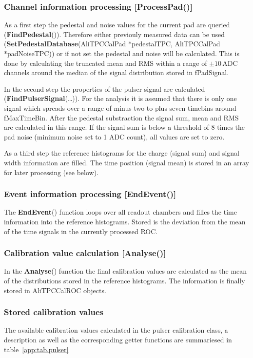 \subsubsection{Channel information processing {\small [ProcessPad()]}}
As a first step the pedestal and noise values for the current pad are queried ({\bf FindPedestal}()). Therefore either previouly measured data can be used ({\bf SetPedestalDatabase}(AliTPCCalPad *pedestalTPC, AliTPCCalPad *padNoiseTPC)) or if not set the pedestal and noise will be calculated. This is done by calculating the truncated mean and RMS within a range of $\pm 10$\,ADC channels around the median of the signal distribution stored in fPadSignal.

In the second step the properties of the pulser signal are calculated ({\bf FindPulserSignal}(\dots)). For the analysis it is assumed that there is only one signal which spreads over a range of minus two to plus seven timebins around fMaxTimeBin. After the pedestal substraction the signal sum, mean and RMS are calculated in this range. If the signal sum is below a threshold of 8 times the pad noise (minimum noise set to 1 ADC count), all values are set to zero.

As a third step the reference histograms for the charge (signal sum) and signal width information are filled. The time position (signal mean) is stored in an array for later processing (see below).

\subsubsection{Event information processing {\small [EndEvent()]}}
The {\bf EndEvent}() function loops over all readout chambers and filles the time information into the reference histograms. Stored is the deviation from the mean of the time signals in the currently processed ROC.

\subsubsection{Calibration value calculation {\small [Analyse()]}}
In the {\bf Analyse}() function the final calibration values are calculated as the mean of the distributions stored in the reference histograms. The information is finally stored in AliTPCCalROC objects.

\subsubsection{Stored calibration values}
The available calibration values calculated in the pulser calibration class, a description as well as the corresponding getter functions are summariesed in table\ \ref{app:tab.pulser}

